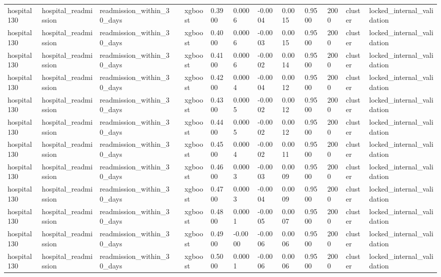 \begin{tabular}{lllllllllllll}
hospital130 & hospital\_readmission & readmission\_within\_30\_days &  & xgboost & 0.3900 & 0.0006 & -0.0004 & 0.0015 & 0.9500 & 2000 & cluster & locked\_internal\_validation \\
hospital130 & hospital\_readmission & readmission\_within\_30\_days &  & xgboost & 0.4000 & 0.0006 & -0.0003 & 0.0015 & 0.9500 & 2000 & cluster & locked\_internal\_validation \\
hospital130 & hospital\_readmission & readmission\_within\_30\_days &  & xgboost & 0.4100 & 0.0006 & -0.0002 & 0.0014 & 0.9500 & 2000 & cluster & locked\_internal\_validation \\
hospital130 & hospital\_readmission & readmission\_within\_30\_days &  & xgboost & 0.4200 & 0.0004 & -0.0004 & 0.0012 & 0.9500 & 2000 & cluster & locked\_internal\_validation \\
hospital130 & hospital\_readmission & readmission\_within\_30\_days &  & xgboost & 0.4300 & 0.0005 & -0.0002 & 0.0012 & 0.9500 & 2000 & cluster & locked\_internal\_validation \\
hospital130 & hospital\_readmission & readmission\_within\_30\_days &  & xgboost & 0.4400 & 0.0005 & -0.0002 & 0.0012 & 0.9500 & 2000 & cluster & locked\_internal\_validation \\
hospital130 & hospital\_readmission & readmission\_within\_30\_days &  & xgboost & 0.4500 & 0.0004 & -0.0002 & 0.0011 & 0.9500 & 2000 & cluster & locked\_internal\_validation \\
hospital130 & hospital\_readmission & readmission\_within\_30\_days &  & xgboost & 0.4600 & 0.0003 & -0.0003 & 0.0009 & 0.9500 & 2000 & cluster & locked\_internal\_validation \\
hospital130 & hospital\_readmission & readmission\_within\_30\_days &  & xgboost & 0.4700 & 0.0003 & -0.0004 & 0.0009 & 0.9500 & 2000 & cluster & locked\_internal\_validation \\
hospital130 & hospital\_readmission & readmission\_within\_30\_days &  & xgboost & 0.4800 & 0.0001 & -0.0005 & 0.0007 & 0.9500 & 2000 & cluster & locked\_internal\_validation \\
hospital130 & hospital\_readmission & readmission\_within\_30\_days &  & xgboost & 0.4900 & -0.0000 & -0.0006 & 0.0006 & 0.9500 & 2000 & cluster & locked\_internal\_validation \\
hospital130 & hospital\_readmission & readmission\_within\_30\_days &  & xgboost & 0.5000 & 0.0001 & -0.0006 & 0.0006 & 0.9500 & 2000 & cluster & locked\_internal\_validation \\

\end{tabular}

